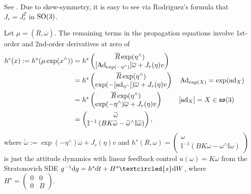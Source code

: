 \documentclass[12pt,class=article,crop=false]{standalone}
\begin{document}
See \cite{Barfoot Integral Forms in Matrix Lie Groups Eq 17}. Due to skew-symmetry, it is easy to see via Rodriguez's formula that $ J_r = J_\ell^{T}$ in $ \operatorname{SO}(3)$.

Let $ \mu = ( \overline{R}, \overline{ \omega}) $. The remaining terms in the propagation equations involve 1st-order and 2nd-order derivatives at zero of
\begin{align*}
	h^{c}(x) := h^s(\mu \exp( x^\wedge )) &= h^s \begin{pmatrix} \overline{R} \exp( \eta^\wedge ) \\ [\Ad_{ \exp( -\eta^\wedge )}] \overline{\omega} + J_r(\eta)v \end{pmatrix}  \\
					    &= h^s \begin{pmatrix} \overline{R} \exp( \eta^\wedge ) \\ \exp( -[\ad_{ \eta^\wedge }]) \overline{\omega} + J_r(\eta) v \end{pmatrix}  && \Ad_{ \exp( X)} = \exp( \ad_{ X}) \\
	&= h^s \begin{pmatrix} \overline{R} \exp( \eta^\wedge ) \\ \exp( - \eta^\wedge) \overline{\omega} + J_r(\eta) v \end{pmatrix}  && [\ad_{ X}] = X \in \mathfrak{so}(3)  \\
	&= \begin{pmatrix} \widetilde{ \omega}\\ \mathbb{I}^{-1} \left( BK \widetilde{ \omega}-  \widetilde{ \omega}^\wedge \mathbb{ I} \widetilde{ \omega} \right) \end{pmatrix}  ,
\end{align*}
where $ \widetilde{ \omega} := \exp( - \eta^\wedge) \overline{\omega} + J_r(\eta) v$ and $ h^s (R, \omega) = \begin{pmatrix} \omega \\ \mathbb{I} ^{-1} \left( BK \omega  - \omega^\wedge \mathbb{ I} \omega \right) \end{pmatrix} $ is just the attitude dynamics with linear feedback control $ u( \omega) = K \omega$ from the Stratonovich SDE  $ g^{-1} \d g = h^s \d t + H^s \textcircled{s} \d W$, where $ H^s = \begin{pmatrix} 0&0\\0&B \end{pmatrix} $. 
\end{document}
